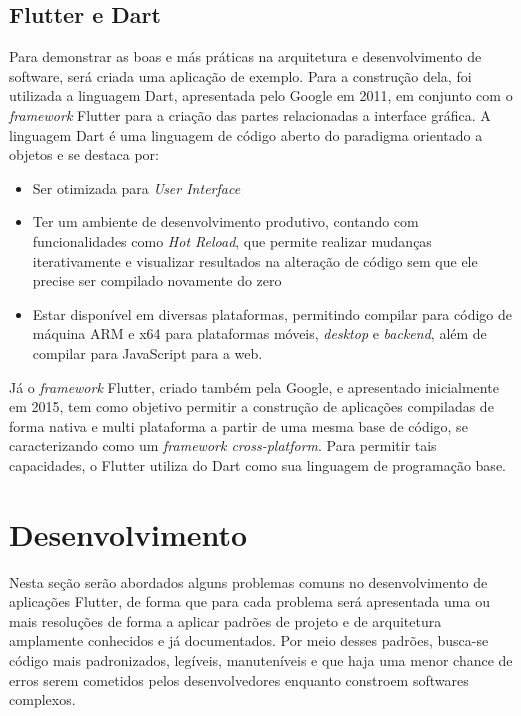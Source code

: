 \documentclass[12pt, %
openright, 
oneside, %
a4paper,    %
brazil]{facom-ufu-abntex2}
\begin{document}
\section{Flutter e Dart}
Para demonstrar as boas e más práticas na arquitetura e desenvolvimento de software, será criada uma aplicação de exemplo. Para a construção dela, foi utilizada a linguagem Dart, apresentada pelo Google em 2011, em conjunto com o \textit{framework} Flutter para a criação das partes relacionadas a interface gráfica. A linguagem Dart é uma linguagem de código aberto do paradigma orientado a objetos e se destaca por:
\begin{itemize}
    \item Ser otimizada para \textit{User Interface}
    \item Ter um ambiente de desenvolvimento produtivo, contando com funcionalidades como \textit{Hot Reload}, que permite realizar mudanças iterativamente e visualizar resultados na alteração de código sem que ele precise ser compilado novamente do zero
    \item Estar disponível em diversas plataformas, permitindo compilar para código de máquina ARM e x64 para plataformas móveis, \textit{desktop} e \textit{backend}, além de compilar para JavaScript para a web.
\end{itemize}
Já o \textit{framework} Flutter, criado também pela Google, e apresentado inicialmente em 2015, tem como objetivo permitir a construção de aplicações compiladas de forma nativa e multi plataforma a partir de uma mesma base de código, se caracterizando como um \textit{framework cross-platform}. Para permitir tais capacidades, o Flutter utiliza do Dart como sua linguagem de programação base.



\chapter{Desenvolvimento} \label{chapt:development}
Nesta seção serão abordados alguns problemas comuns no desenvolvimento de aplicações Flutter, de forma que para cada problema será apresentada uma ou mais resoluções de forma a aplicar padrões de projeto e de arquitetura amplamente conhecidos e já documentados. Por meio desses padrões, busca-se código mais padronizados, legíveis, manuteníveis e que haja uma menor chance de erros serem cometidos pelos desenvolvedores enquanto constroem softwares complexos.
\end{document}
